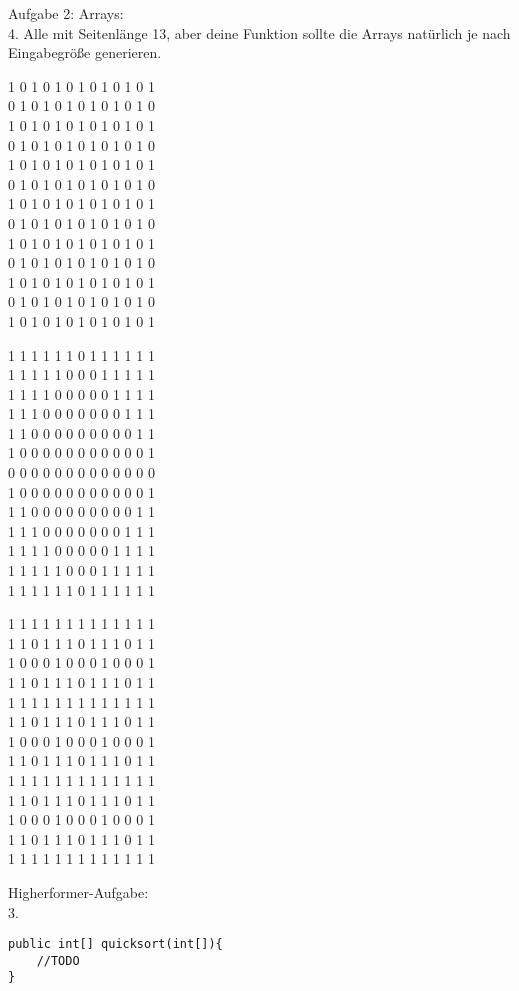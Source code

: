 \documentclass{../../sheet}
\begin{document}
\newpage
{}
Aufgabe 2: Arrays:\\
4. Alle mit Seitenlänge 13, aber deine Funktion sollte die Arrays natürlich je nach Eingabegröße generieren.
\begin{ausgabe}
    1 0 1 0 1 0 1 0 1 0 1 0 1 \\
    0 1 0 1 0 1 0 1 0 1 0 1 0 \\
    1 0 1 0 1 0 1 0 1 0 1 0 1 \\
    0 1 0 1 0 1 0 1 0 1 0 1 0 \\
    1 0 1 0 1 0 1 0 1 0 1 0 1 \\
    0 1 0 1 0 1 0 1 0 1 0 1 0 \\
    1 0 1 0 1 0 1 0 1 0 1 0 1 \\
    0 1 0 1 0 1 0 1 0 1 0 1 0 \\
    1 0 1 0 1 0 1 0 1 0 1 0 1 \\
    0 1 0 1 0 1 0 1 0 1 0 1 0 \\
    1 0 1 0 1 0 1 0 1 0 1 0 1 \\
    0 1 0 1 0 1 0 1 0 1 0 1 0 \\
    1 0 1 0 1 0 1 0 1 0 1 0 1
\end{ausgabe}
\begin{ausgabe}
    1 1 1 1 1 1 0 1 1 1 1 1 1 \\
    1 1 1 1 1 0 0 0 1 1 1 1 1 \\
    1 1 1 1 0 0 0 0 0 1 1 1 1 \\
    1 1 1 0 0 0 0 0 0 0 1 1 1 \\
    1 1 0 0 0 0 0 0 0 0 0 1 1 \\
    1 0 0 0 0 0 0 0 0 0 0 0 1 \\
    0 0 0 0 0 0 0 0 0 0 0 0 0 \\
    1 0 0 0 0 0 0 0 0 0 0 0 1 \\
    1 1 0 0 0 0 0 0 0 0 0 1 1 \\
    1 1 1 0 0 0 0 0 0 0 1 1 1 \\
    1 1 1 1 0 0 0 0 0 1 1 1 1 \\
    1 1 1 1 1 0 0 0 1 1 1 1 1 \\
    1 1 1 1 1 1 0 1 1 1 1 1 1
\end{ausgabe}
\begin{ausgabe}
    1 1 1 1 1 1 1 1 1 1 1 1 1 \\
    1 1 0 1 1 1 0 1 1 1 0 1 1 \\
    1 0 0 0 1 0 0 0 1 0 0 0 1 \\
    1 1 0 1 1 1 0 1 1 1 0 1 1 \\
    1 1 1 1 1 1 1 1 1 1 1 1 1 \\
    1 1 0 1 1 1 0 1 1 1 0 1 1 \\
    1 0 0 0 1 0 0 0 1 0 0 0 1 \\
    1 1 0 1 1 1 0 1 1 1 0 1 1 \\
    1 1 1 1 1 1 1 1 1 1 1 1 1 \\
    1 1 0 1 1 1 0 1 1 1 0 1 1 \\
    1 0 0 0 1 0 0 0 1 0 0 0 1 \\
    1 1 0 1 1 1 0 1 1 1 0 1 1 \\
    1 1 1 1 1 1 1 1 1 1 1 1 1
\end{ausgabe}

Higherformer-Aufgabe:\\
3.
\begin{verbatim}
public int[] quicksort(int[]){
    //TODO
}
\end{verbatim}
\end{document}
